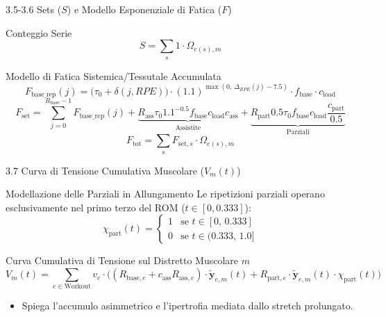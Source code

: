 \documentclass[aspectratio=169, 10pt]{beamer}
\begin{document}
\begin{frame}{3.5-3.6 Sets ($S$) e Modello Esponenziale di Fatica ($F$)}
    \begin{block}{Conteggio Serie}
        $$S = \sum_{s} 1 \cdot \Omega_{e(s), m}$$
    \end{block}
    \begin{block}{Modello di Fatica Sistemica/Tessutale Accumulata}
        $$F_{\mathrm{base\_rep}}(j) = \big(\tau_0 + \delta(j, RPE)\big) \cdot (1.1)^{\max(0, \, \Delta_{RPE}(j) - 7.5)} \cdot f_{\mathrm{base}} \cdot c_{\mathrm{load}}$$
        \vspace{0.1cm}
        $$F_{\mathrm{set}} = \sum_{j=0}^{R_{\mathrm{base}}-1} F_{\mathrm{base\_rep}}(j) + \underbrace{R_{\mathrm{ass}} \tau_0 1.1^{-0.5} f_{\mathrm{base}} c_{\mathrm{load}} c_{\mathrm{ass}}}_{\text{Assistite}} + \underbrace{R_{\mathrm{part}} 0.5\tau_0 f_{\mathrm{base}} c_{\mathrm{load}} \frac{c_{\mathrm{part}}}{0.5}}_{\text{Parziali}}$$
        $$F_{\mathrm{tot}} = \sum_{s} F_{\mathrm{set}, s} \cdot \Omega_{e(s), m}$$
    \end{block}
\end{frame}

\begin{frame}{3.7 Curva di Tensione Cumulativa Muscolare ($V_m(t)$)}
    \begin{block}{Modellazione delle Parziali in Allungamento}
        Le ripetizioni parziali operano esclusivamente nel primo terzo del ROM ($t \in [0, 0.333]$):
        $$\chi_{\mathrm{part}}(t) = \begin{cases} 1 & \text{se } t \in [0, \, 0.333] \\ 0 & \text{se } t \in (0.333, \, 1.0] \end{cases}$$
    \end{block}
    \begin{alertblock}{Curva Cumulativa di Tensione sul Distretto Muscolare $m$}
        $$V_m(t) = \sum_{e \in \text{Workout}} v_e \cdot \Big( (R_{\mathrm{base}, e} + c_{\mathrm{ass}} R_{\mathrm{ass}, e}) \cdot \tilde{\mathbf{y}}_{e,m}(t) + R_{\mathrm{part}, e} \cdot \tilde{\mathbf{y}}_{e,m}(t) \cdot \chi_{\mathrm{part}}(t) \Big)$$
    \end{alertblock}
    \begin{itemize}
        \item Spiega l'accumulo asimmetrico e l'ipertrofia mediata dallo stretch prolungato.
    \end{itemize}
\end{frame}
\end{document}

